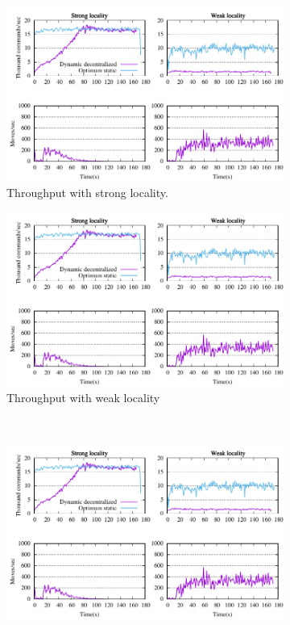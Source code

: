 \begin{figure}[t]
  \centering
  \begin{subfigure}[b]{0.45\textwidth}
    \centering
    \includegraphics[width=0.95\columnwidth]{figures/motivation}    
    \caption{Throughput with strong locality.}
  \end{subfigure}
  \begin{subfigure}[b]{0.45\textwidth}
    \centering
    \includegraphics[width=0.95\columnwidth]{figures/motivation}
    \caption{Throughput with weak locality}
  \end{subfigure} \\
  \begin{subfigure}[b]{0.45\textwidth}
    \centering
    \includegraphics[width=0.95\columnwidth]{figures/motivation}

\end{subfigure}
\end{figure}
